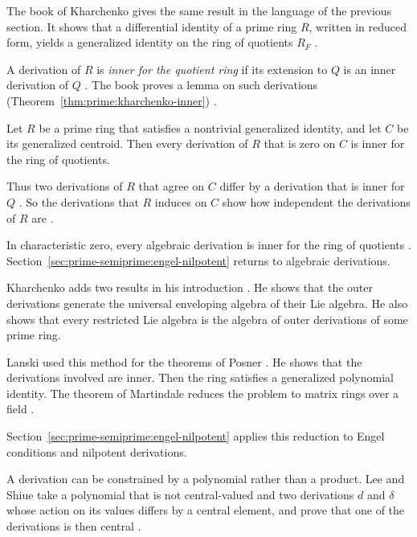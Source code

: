 The book of Kharchenko gives the same result in the language of the previous
section. It shows that a differential identity of a prime ring $R$, written in
reduced form, yields a generalized identity on the ring of quotients $R_F$
\cite[Theorem~2.4.1, pp.~112--113]{Kharchenko1991}.

A derivation of $R$ is \emph{inner for the quotient ring} if its extension to $Q$
is an inner derivation of $Q$ \cite[p.~156]{Kharchenko1978}. The book proves a
lemma on such derivations (Theorem~\ref{thm:prime:kharchenko-inner}) \cite[Lemma~2.4.2, p.~113]{Kharchenko1991}.

\begin{theorem}\label{thm:prime:kharchenko-inner}
Let $R$ be a prime ring that satisfies a nontrivial generalized identity, and let
$C$ be its generalized centroid. Then every derivation of $R$ that is zero on
$C$ is inner for the ring of quotients.
\end{theorem}

Thus two derivations of $R$ that agree on $C$ differ by a derivation that is
inner for $Q$ \cite[p.~114]{Kharchenko1991}. So the derivations that $R$ induces
on $C$ show how independent the derivations of $R$ are
\cite[p.~114]{Kharchenko1991}.

In characteristic zero, every algebraic derivation is inner for the ring of
quotients \cite[p.~155]{Kharchenko1978}.
Section~\ref{sec:prime-semiprime:engel-nilpotent} returns to algebraic
derivations.

Kharchenko adds two results in his introduction \cite[p.~155]{Kharchenko1978}.
He shows that the outer derivations generate the universal enveloping algebra
of their Lie algebra. He also shows that every restricted Lie algebra is the
algebra of outer derivations of some prime ring.

Lanski used this method for the theorems of Posner \cite[p.~276]{Lanski1988}. He
shows that the derivations involved are inner. Then the ring satisfies a
generalized polynomial identity. The theorem of Martindale reduces the problem
to matrix rings over a field \cite[p.~276]{Lanski1988}.

Section~\ref{sec:prime-semiprime:engel-nilpotent} applies this reduction to Engel
conditions and nilpotent derivations.

A derivation can be constrained by a polynomial rather than a product. Lee and
Shiue take a polynomial that is not central-valued and two derivations $d$ and
$\delta$ whose action on its values differs by a central element, and prove that
one of the derivations is then central
\cite[Abstract]{LeeShiue1998Cocentralizing}.

